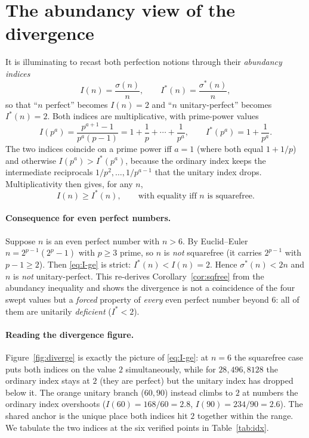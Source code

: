 \documentclass[11pt,a4paper]{article}
\newcommand{\sig}{\sigma}
\newcommand{\sigs}{\sigma^{*}}
\theoremstyle{plain}
\theoremstyle{definition}
\begin{document}
\section{The abundancy view of the divergence}
\label{sec:abundancy}

It is illuminating to recast both perfection notions through their
\emph{abundancy indices}
\begin{equation}
  I(n)=\frac{\sig(n)}{n},
  \qquad
  I^{*}(n)=\frac{\sigs(n)}{n},
  \label{eq:abundancy}
\end{equation}
so that ``$n$ perfect'' becomes $I(n)=2$ and ``$n$ unitary-perfect'' becomes
$I^{*}(n)=2$. Both indices are multiplicative, with prime-power values
\begin{equation}
  I(p^a)=\frac{p^{a+1}-1}{p^a(p-1)}=1+\frac1p+\cdots+\frac1{p^a},
  \qquad
  I^{*}(p^a)=1+\frac1{p^a}.
  \label{eq:I-pp}
\end{equation}
The two indices coincide on a prime power iff $a=1$ (where both equal $1+1/p$)
and otherwise $I(p^a)>I^{*}(p^a)$, because the ordinary index keeps the
intermediate reciprocals $1/p^2,\dots,1/p^{a-1}$ that the unitary index drops.
Multiplicativity then gives, for any $n$,
\begin{equation}
  I(n)\ge I^{*}(n),
  \qquad\text{with equality iff $n$ is squarefree.}
  \label{eq:I-ge}
\end{equation}

\paragraph{Consequence for even perfect numbers.} Suppose $n$ is an even perfect
number with $n>6$. By Euclid--Euler $n=2^{p-1}(2^p-1)$ with $p\ge3$ prime, so
$n$ is \emph{not} squarefree (it carries $2^{p-1}$ with $p-1\ge2$). Then
\eqref{eq:I-ge} is strict: $I^{*}(n)<I(n)=2$. Hence $\sigs(n)<2n$ and $n$ is
\emph{not} unitary-perfect. This re-derives Corollary~\ref{cor:sqfree} from the
abundancy inequality and shows the divergence is not a coincidence of the four
swept values but a \emph{forced} property of \emph{every} even perfect number
beyond $6$: all of them are unitarily \emph{deficient} ($I^{*}<2$).

\paragraph{Reading the divergence figure.} Figure~\ref{fig:diverge} is exactly
the picture of \eqref{eq:I-ge}: at $n=6$ the squarefree case puts both indices
on the value $2$ simultaneously, while for $28,496,8128$ the ordinary index
stays at $2$ (they are perfect) but the unitary index has dropped below it. The
orange unitary branch ($60,90$) instead climbs to $2$ at numbers the ordinary
index overshoots ($I(60)=168/60=2.8$, $I(90)=234/90=2.6$). The shared anchor is
the unique place both indices hit $2$ together within the range. We tabulate the
two indices at the six verified points in Table~\ref{tab:idx}.
\end{document}
